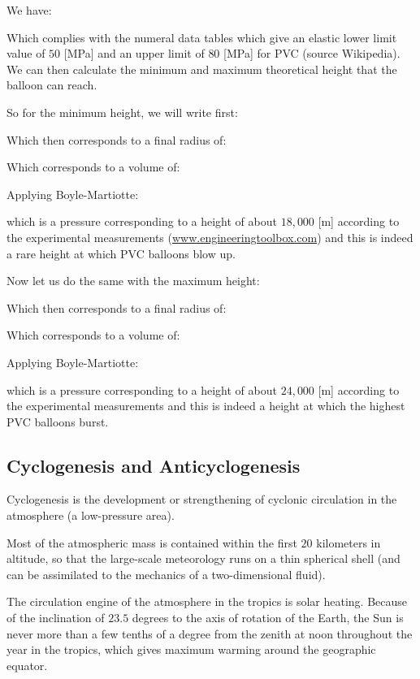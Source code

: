 	We have:
	
	Which complies with the numeral data tables which give an elastic lower limit value of $50$ [MPa] and an upper limit of $80$ [MPa] for PVC (source Wikipedia). We can then calculate the minimum and maximum theoretical height that the balloon can reach.

	So for the minimum height, we will write first:
	
	Which then corresponds to a final radius of:
	
	Which corresponds to a volume of:
	
	Applying Boyle-Martiotte:
	
	which is a pressure corresponding to a height of about $18,000$ [m] according to the experimental measurements (\url{www.engineeringtoolbox.com}) and this is indeed a rare height at which PVC balloons blow up.

	Now let us do the same with the maximum height:
	

	Which then corresponds to a final radius of:
	
	Which corresponds to a volume of:
	
	Applying Boyle-Martiotte:
	
	which is a pressure corresponding to a height of about $24,000$ [m] according to the experimental measurements and this is indeed a height at which the highest PVC balloons burst.
	
	\subsection{Cyclogenesis and Anticyclogenesis}
	Cyclogenesis is the development or strengthening of cyclonic circulation in the atmosphere (a low-pressure area). 
	
	Most of the atmospheric mass is contained within the first $20$ kilometers in altitude, so that the large-scale meteorology runs on a thin spherical shell (and can be assimilated to the mechanics of a two-dimensional fluid).

	The circulation engine of the atmosphere in the tropics is solar heating. Because of the inclination of $23.5$ degrees to the axis of rotation of the Earth, the Sun is never more than a few tenths of a degree from the zenith at noon throughout the year in the tropics, which gives maximum warming around the geographic equator.

